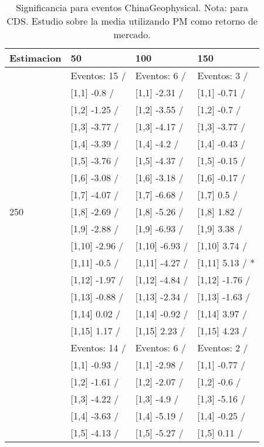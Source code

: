 \begin{table}

\caption{Significancia para eventos ChinaGeophysical. Nota: para CDS. Estudio sobre la media utilizando PM como retorno de mercado.}
\centering
\begin{tabular}[t]{llll}
\toprule
Estimacion & 50 & 100 & 150\\
\midrule
 & Eventos:  15 / & Eventos:  6 / & Eventos:  3 /\\
 & {}[1,1] -0.8  / & {}[1,1] -2.31  / & {}[1,1] -0.71  /\\
 & {}[1,2] -1.25  / & {}[1,2] -3.55  / & {}[1,2] -0.7  /\\
 & {}[1,3] -3.77  / & {}[1,3] -4.17  / & {}[1,3] -3.77  /\\
 & {}[1,4] -3.39  / & {}[1,4] -4.2  / & {}[1,4] -0.43  /\\
\addlinespace
 & {}[1,5] -3.76  / & {}[1,5] -4.37  / & {}[1,5] -0.15  /\\
 & {}[1,6] -3.08  / & {}[1,6] -3.18  / & {}[1,6] -0.17  /\\
 & {}[1,7] -4.07  / & {}[1,7] -6.68  / & {}[1,7] 0.5  /\\
250 & {}[1,8] -2.69  / & {}[1,8] -5.26  / & {}[1,8] 1.82  /\\
 & {}[1,9] -2.88  / & {}[1,9] -6.93  / & {}[1,9] 3.38  /\\
\addlinespace
 & {}[1,10] -2.96  / & {}[1,10] -6.93  / & {}[1,10] 3.74  /\\
 & {}[1,11] -0.5  / & {}[1,11] -4.27  / & {}[1,11] 5.13  / *\\
 & {}[1,12] -1.97  / & {}[1,12] -4.84  / & {}[1,12] -1.76  /\\
 & {}[1,13] -0.88  / & {}[1,13] -2.34  / & {}[1,13] -1.63  /\\
 & {}[1,14] 0.02  / & {}[1,14] -0.92  / & {}[1,14] 3.97  /\\
\addlinespace
 & {}[1,15] 1.17  / & {}[1,15] 2.23  / & {}[1,15] 4.23  /\\
 & Eventos:  14 / & Eventos:  6 / & Eventos:  2 /\\
 & {}[1,1] -0.93  / & {}[1,1] -2.98  / & {}[1,1] -0.77  /\\
 & {}[1,2] -1.61  / & {}[1,2] -2.07  / & {}[1,2] -0.6  /\\
 & {}[1,3] -4.22  / & {}[1,3] -4.9  / & {}[1,3] -5.16  /\\
\addlinespace
 & {}[1,4] -3.63  / & {}[1,4] -5.19  / & {}[1,4] -0.25  /\\
 & {}[1,5] -4.13  / & {}[1,5] -5.27  / & {}[1,5] 0.11  /\\

\end{tabular}
\end{table}
